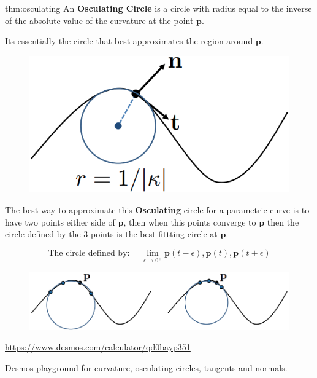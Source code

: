 \documentclass{article}
\begin{document}
\newpage

\begin{defin}{thm:osculating}
    An \textbf{Osculating Circle} is a circle with radius equal to the inverse of the absolute value of the
    curvature at the point \(\mathbf{p}\).

    \vspace{5px}

    Its essentially the circle that best approximates the region around \(\mathbf{p}\).
\end{defin}

\begin{figure}[!ht]
    \centering
    \includegraphics[width=0.4\linewidth]{images/osculating_circle.png}
\end{figure}


The best way to approximate this \textbf{Osculating} circle for a parametric curve is to have two points 
either side of \(\mathbf{p}\), then when this points converge to \(\mathbf{p}\) then the circle
defined by the 3 points is the best fittting circle at \(\mathbf{p}\).

\[
    \text{The circle defined by: } \quad \lim_{\epsilon \to 0^+} \mathbf{p}(t-\epsilon), \mathbf{p}(t), \mathbf{p}(t+\epsilon) 
\]


\begin{figure}[!ht]
    \centering
    \includegraphics[width=0.8\linewidth]{images/approx_osculating_circle.png}
\end{figure}

\begin{center}
    \begin{minipage}{0.8\textwidth}
        \url{https://www.desmos.com/calculator/qd0bayp351}
        
        Desmos playground for curvature, osculating circles, tangents and normals.
    \end{minipage}
\end{center}
\end{document}
